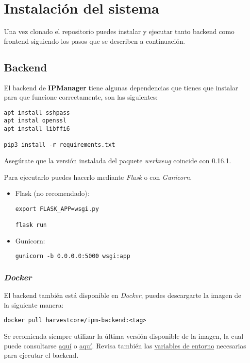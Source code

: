 \chapter{Instalación del sistema}

Una vez clonado el repositorio puedes instalar y ejecutar tanto backend como frontend siguiendo los pasos que se describen a continuación.

\section{Backend}
El backend de \textbf{IPManager} tiene algunas dependencias que tienes que instalar para que funcione correctamente, son las siguientes:

\begin{lstlisting}
apt install sshpass
apt instal openssl
apt install libffi6

pip3 install -r requirements.txt
\end{lstlisting}

Asegúrate que la versión instalada del paquete \textit{werkzeug} coincide con 0.16.1.

Para ejecutarlo puedes hacerlo mediante \textit{Flask} o con \textit{Gunicorn}.
\begin{itemize}
	\item Flask (no recomendado):
\begin{lstlisting}
export FLASK_APP=wsgi.py

flask run
\end{lstlisting}
	
	\item Gunicorn:
\begin{lstlisting}
gunicorn -b 0.0.0.0:5000 wsgi:app
\end{lstlisting}
	
\end{itemize}

\subsection{\textit{Docker}}
El backend también está disponible en \textit{Docker}, puedes descargarte la imagen de la siguiente manera:

\begin{lstlisting}
docker pull harvestcore/ipm-backend:<tag>
\end{lstlisting}

Se recomienda siempre utilizar la última versión disponible de la imagen, la cual puede consultarse \href{https://github.com/harvestcore/tfg/releases}{aquí} o \href{https://hub.docker.com/r/harvestcore/ipm-backend/tags}{aquí}. Revisa también las \hyperref[sec:variables]{variables de entorno} necesarias para ejecutar el backend.

